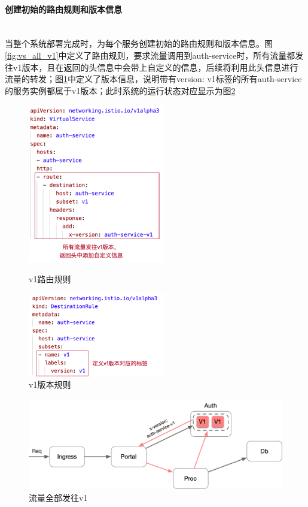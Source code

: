 \documentclass[a4paper]{article}
\theoremstyle{definition}
\begin{document}
\paragraph{创建初始的路由规则和版本信息}\label{section:setup}\mbox{}\\

当整个系统部署完成时，为每个服务创建初始的路由规则和版本信息。图\ref{fig:vs_all_v1}中定义了路由规则，要求流量调用到auth-service时，所有流量都发往v1版本，且在返回的头信息中会带上自定义的信息，后续将利用此头信息进行流量的转发；图\ref{fig:dr_v1}中定义了版本信息，说明带有{version: v1}标签的所有auth-service的服务实例都属于v1版本；此时系统的运行状态对应显示为图\ref{fig:traffic_all_v1}
\begin{figure}[htbp]
\centering
\begin{minipage}[t]{0.48\textwidth}
\centering
\centerline{\includegraphics[width=6cm]{vs_all_v1.png}}
\caption{v1路由规则}
\label{fig:vs_all_v1}
\end{minipage}
\begin{minipage}[t]{0.48\textwidth}
\centering
\centerline{\includegraphics[width=6cm]{dr_v1.png}}
\caption{v1版本规则}
\label{fig:dr_v1}
\end{minipage}
\end{figure}

\begin{figure}[!ht]
 \centering
 \includegraphics[height=4cm]{images/traffic_all_v1.png}
 \caption{流量全部发往v1}
 \label{fig:traffic_all_v1}
\end{figure}
\end{document}
